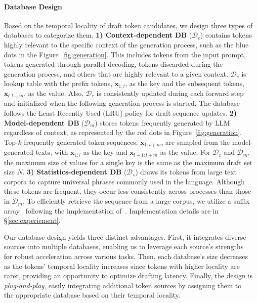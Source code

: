\paragraph{Database Design}  
 Based on the temporal locality of draft token candidates, we design three types of databases to categorize them. 
\textbf{1) Context-dependent DB} (\(\mathcal{D}_c\)) contains tokens highly relevant to the specific context of the generation process, such as the blue dots in the Figure~\ref{fig:generation}. 
This includes tokens from the input prompt, tokens generated through parallel decoding, tokens discarded during the generation process, and others that are highly relevant to a given context.  
\(\mathcal{D}_c\) is lookup table with the prefix tokens, \(\bm{x}_{1:l}\), as the key and the subsequent tokens, \(\bm{x}_{l:l+m}\), as the value.
Also, \(\mathcal{D}_c\) is consistently updated during each forward step and initialized when the following generation process is started. 
The database follows the Least Recently Used (LRU) policy for draft sequence updates.
\textbf{2) Model-dependent DB} (\(\mathcal{D}_m\)) stores tokens frequently generated by LLM regardless of context, as represented by the red dots in Figure~\ref{fig:generation}.
Top-$k$ frequently generated token sequences, $\bm{x}_{1:l+m}$, are sampled from the model-generated texts, with $\bm{x}_{1:l}$ as the key and $\bm{x}_{l+1:l+m}$ as the value.
For \(\mathcal{D}_c\) and \(\mathcal{D}_m\), the maximum size of values for a single key is the same as the maximum draft set size \(N\). 
\textbf{3) Statistics-dependent DB} (\(\mathcal{D}_s\)) draws its tokens from large text corpora to capture universal phrases commonly used in the language. 
Although these tokens are frequent, they occur less consistently across processes than those in \(\mathcal{D}_m\).
To efficiently retrieve the sequence from a large corpus, we utilize a suffix array~\cite{suffix_array} following the implementation of~\citet{REST}.
Implementation details are in \S\ref{sec:experiement}.


Our database design yields three distinct advantages. First, it integrates diverse sources into multiple databases, enabling us to leverage each source’s strengths for robust acceleration across various tasks. Then, each database’s size decreases as the tokens’ temporal locality increases since tokens with higher locality are rarer, providing an opportunity to optimize drafting latency. Finally, the design is \textit{plug-and-play}, easily integrating additional token sources by assigning them to the appropriate database based on their temporal locality.

